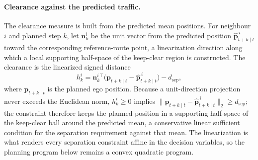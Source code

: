 \documentclass[11pt]{article}
\theoremstyle{plain}
\theoremstyle{definition}
\begin{document}
\paragraph{Clearance against the predicted traffic.}
The clearance measure is built from the predicted mean positions. For
neighbour $i$ and planned step $k$, let
$\bm{n}^{i}_{k}$ be the unit vector from the predicted position
$\hat{\bm{p}}^{\,i}_{t+k \mid t}$ toward the corresponding
reference-route point, a linearization direction along which a local
supporting half-space of the keep-clear region is constructed. The clearance is the
linearized signed distance
\begin{equation}
	\label{eq:cbf-barrier}
	h^{i}_{k}
	= \bm{n}^{i\,\top}_{k}
	\big( \bm{p}_{t+k \mid t} - \hat{\bm{p}}^{\,i}_{t+k \mid t} \big)
	- d_{\mathrm{sep}},
\end{equation}
where $\bm{p}_{t+k \mid t}$ is the planned ego position. Because a
unit-direction projection never exceeds the Euclidean norm,
$h^i_k \geq 0$ implies
$\| \bm{p}_{t+k \mid t} - \hat{\bm{p}}^{\,i}_{t+k \mid t} \|_2 \geq
	d_{\mathrm{sep}}$; the constraint therefore keeps the planned
position in a supporting half-space of the keep-clear ball around the
predicted mean, a conservative linear sufficient condition for the
separation requirement against that mean. The linearization is what
renders every separation constraint affine in the decision variables,
so the planning program below remains a convex quadratic program.
 
\end{document}
